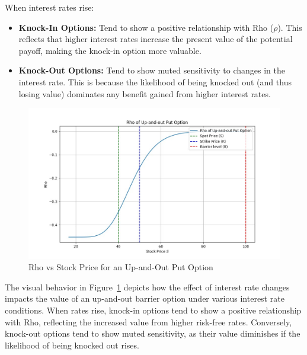When interest rates rise:
\begin{itemize}
    \item \textbf{Knock-In Options:} Tend to show a positive relationship with Rho (\(\rho\)). This reflects that higher interest rates increase the present value of the potential payoff, making the knock-in option more valuable.
    \item \textbf{Knock-Out Options:} Tend to show muted sensitivity to changes in the interest rate. This is because the likelihood of being knocked out (and thus losing value) dominates any benefit gained from higher interest rates.
\end{itemize}
\begin{figure}[H]
    \centering
    \includegraphics[width=.65\linewidth]{content/images/rho_upout.png}
    \caption{Rho vs Stock Price for an Up-and-Out Put Option}
    \label{fig:rho_behavior}
\end{figure}

The visual behavior in Figure~\ref{fig:rho_behavior} depicts how the effect of interest rate changes impacts the value of an up-and-out barrier option under various interest rate conditions. When rates rise, knock-in options tend to show a positive relationship with Rho, reflecting the increased value from higher risk-free rates. Conversely, knock-out options tend to show muted sensitivity, as their value diminishes if the likelihood of being knocked out rises.

